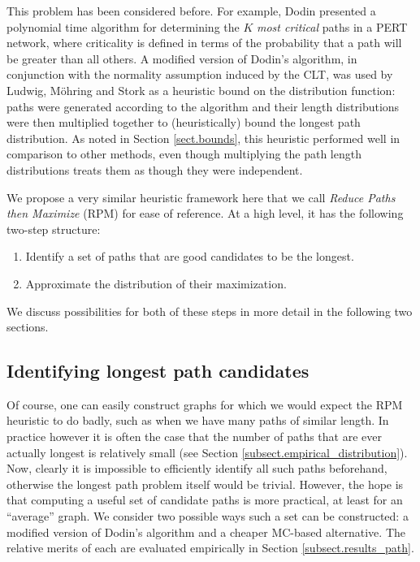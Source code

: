 \documentclass[12pt]{article}
\begin{document}
This problem has been considered before. For example, Dodin \cite{dod84} presented a polynomial time algorithm for determining the $K$ {\em most critical} paths in a PERT network, where criticality is defined in terms of the probability that a path will be greater than all others. A modified version of Dodin's algorithm, in conjunction with the normality assumption induced by the CLT, was used by Ludwig, M{\"o}hring and Stork \cite{lud01} as a heuristic bound on the distribution function: paths were generated according to the algorithm and their length distributions were then multiplied together to (heuristically) bound the longest path distribution. As noted in Section \ref{sect.bounds}, this heuristic performed well in comparison to other methods, even though multiplying the path length distributions treats them as though they were independent.

We propose a very similar heuristic framework here that we call {\em Reduce Paths then Maximize} (RPM) for ease of reference. At a high level, it has the following two-step structure:
\begin{enumerate}
\item Identify a set of paths that are good candidates to be the longest.
  \item Approximate the distribution of their maximization.
  \end{enumerate}
  We discuss possibilities for both of these steps in more detail in the following two sections. 

\subsection{Identifying longest path candidates}
\label{subsect.path_identifying}

Of course, one can easily construct graphs for which we would expect the RPM heuristic to do badly, such as when we have many paths of similar length. In practice however it is often the case that the number of paths that are ever actually longest is relatively small (see Section \ref{subsect.empirical_distribution}). Now, clearly it is impossible to efficiently identify all such paths beforehand, otherwise the longest path problem itself would be trivial. However, the hope is that computing a useful set of candidate paths is more practical, at least for an ``average'' graph. We consider two possible ways such a set can be constructed: a modified version of Dodin's algorithm \cite{dod84} and a cheaper MC-based alternative. The relative merits of each are evaluated empirically in Section \ref{subsect.results_path}. 
\end{document}
